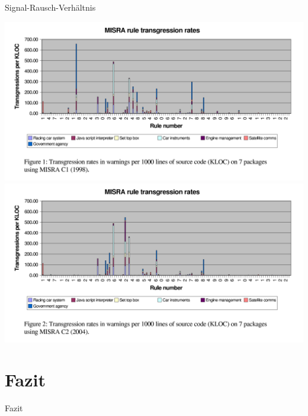 \documentclass{beamer}
\begin{document}

    \begin{frame}{Signal-Rausch-Verhältnis}
        \begin{center}
            \begin{overprint}
                 {
                \includegraphics[width=\textwidth,height=0.8\textheight,keepaspectratio]{graphics/1998-transgression-rates.png}
                }
                 {
                \includegraphics[width=\textwidth,height=0.8\textheight,keepaspectratio]{graphics/2004-transgression-rates.png}
                }
            \end{overprint}
        \end{center}
    \end{frame}

    \section{Fazit}

    \label{sec:fazit}
    \begin{frame}{Fazit}

    \end{frame}
\end{document}
